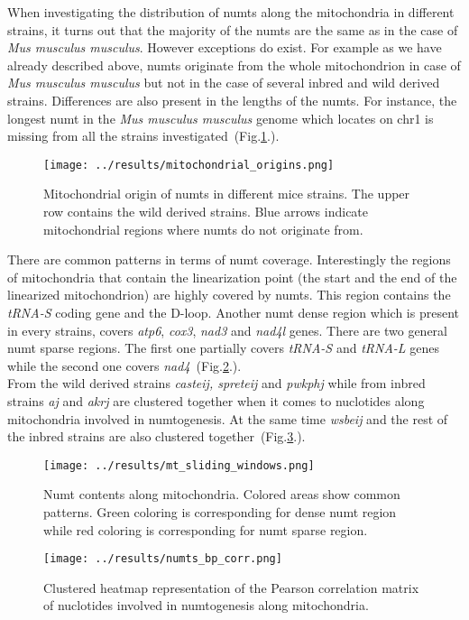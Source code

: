 \documentclass[a4paper,12pt]{article}
\numberwithin{equation}{section} %
\begin{document}
\indent When investigating the distribution of numts along the mitochondria in different strains, it turns out that the majority of the numts are the same as in the case of  \textit{Mus musculus musculus}. However exceptions do exist. For example as we have already described above,  numts originate from the whole mitochondrion in case of  \textit{Mus musculus musculus} but not in the case of several inbred and wild derived strains. Differences are also present in the lengths of the numts. For instance, the longest numt in the \textit{Mus musculus musculus} genome which locates on chr1 is missing from all the strains investigated~(Fig.\ref{fig:mitochondrial_origins}.). 
\begin{figure}[H]
    \centering
    \captionsetup{justification=centering}
    \texttt{[image: ../results/mitochondrial\_origins.png]}
    \caption{Mitochondrial origin of numts in different mice strains. The upper row contains the wild derived strains. Blue arrows indicate mitochondrial regions where numts do not originate from.}
    \label{fig:mitochondrial_origins}
\end{figure}

\indent There are common patterns in terms of  numt coverage. Interestingly the regions of mitochondria that contain the linearization point (the start and the end of the linearized mitochondrion) are highly covered by numts. This region contains the \textit{tRNA-S} coding gene and the D-loop. Another numt dense region which is present in every strains, covers \textit{atp6}, \textit{cox3}, \textit{nad3} and \textit{nad4l} genes. There are two general numt sparse regions. The first one partially covers \textit{tRNA-S} and \textit{tRNA-L} genes while the second one covers \textit{nad4}~(Fig.\ref{fig:mt_sliding_windows}.).\\ \indent From the wild derived strains \textit{casteij, spreteij} and \textit{pwkphj} while from inbred strains \textit{aj} and \textit{akrj} are clustered together when it comes to nuclotides along mitochondria involved in numtogenesis. At the same time \textit{wsbeij} and the rest of the inbred strains are also clustered together~(Fig.\ref{fig:numts_bp_corr}.).
\begin{figure}[H]
    \centering
    \captionsetup{justification=centering}
    \texttt{[image: ../results/mt\_sliding\_windows.png]}
    \caption{Numt contents along mitochondria. Colored areas show common patterns. Green coloring is corresponding for dense numt region while red coloring is corresponding for numt sparse region.}
    \label{fig:mt_sliding_windows}
\end{figure}
\begin{figure}[H]
    \centering
    \captionsetup{justification=centering}
    \texttt{[image: ../results/numts\_bp\_corr.png]}
    \caption{Clustered heatmap representation of the Pearson correlation matrix of nuclotides involved in numtogenesis along mitochondria.}
    \label{fig:numts_bp_corr}
\end{figure}
\end{document}
